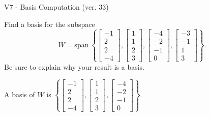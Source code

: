 \begin{exercise}
  \begin{exerciseTitle}V7 - Basis Computation (ver. 33)\end{exerciseTitle}
  \begin{exerciseStatement}
    Find a basis for the subspace 
\[W=\mathrm{span}\ \left\{\left[\begin{array}{r}
-1 \\
2 \\
2 \\
-4
\end{array}\right] , \left[\begin{array}{r}
1 \\
1 \\
2 \\
3
\end{array}\right] , \left[\begin{array}{r}
-4 \\
-2 \\
-1 \\
0
\end{array}\right] , \left[\begin{array}{r}
-3 \\
-1 \\
1 \\
3
\end{array}\right]\right\}.\]
 Be sure to explain why your result is a basis.


  \end{exerciseStatement}
  \begin{exerciseAnswer}
   A basis of \(W\) is  \(\left\{\left[\begin{array}{r}
-1 \\
2 \\
2 \\
-4
\end{array}\right] , \left[\begin{array}{r}
1 \\
1 \\
2 \\
3
\end{array}\right] , \left[\begin{array}{r}
-4 \\
-2 \\
-1 \\
0
\end{array}\right]\right\}\).
  


  \end{exerciseAnswer}
\end{exercise}